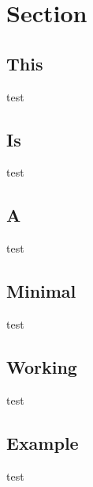 \documentclass{beamer}
\begin{document}
\begin{frame}
\tableofcontents
\end{frame}
\section{Section}
\subsection{This}
\begin{frame}{test}
\end{frame}
\subsection{Is}
\begin{frame}{test}
\end{frame}
\subsection{A}
\begin{frame}{test}
\end{frame}
\subsection{Minimal}
\begin{frame}{test}
\end{frame}
\subsection{Working}
\begin{frame}{test}
\end{frame}
\subsection{Example}
\begin{frame}{test}
\end{frame}
\end{document}

